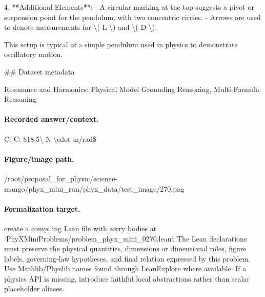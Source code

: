 4. **Additional Elements**:
   - A circular marking at the top suggests a pivot or suspension point for the pendulum, with two concentric circles.
   - Arrows are used to denote measurements for \textbackslash{}( L \textbackslash{}) and \textbackslash{}( D \textbackslash{}).

This setup is typical of a simple pendulum used in physics to demonstrate oscillatory motion.

\#\# Dataset metadata

Resonance and Harmonics; Physical Model Grounding Reasoning, Multi-Formula Reasoning

\paragraph{Recorded answer/context.}
C: C: \$18.5\textbackslash{} N \textbackslash{}cdot m/rad\$

\paragraph{Figure/image path.}
/root/proposal\_for\_physic/science-mango/phyx\_mini\_run/phyx\_data/test\_image/270.png

\paragraph{Formalization target.}
create a compiling Lean file with sorry bodies at `PhyXMiniProblems/problem\_phyx\_mini\_0270.lean`. The Lean declarations must preserve the physical quantities, dimensions or dimensional roles, figure labels, governing-law hypotheses, and final relation expressed by this problem.
Use Mathlib/Physlib names found through LeanExplore where available. If a physics API is missing, introduce faithful local abstractions rather than scalar placeholder aliases.

